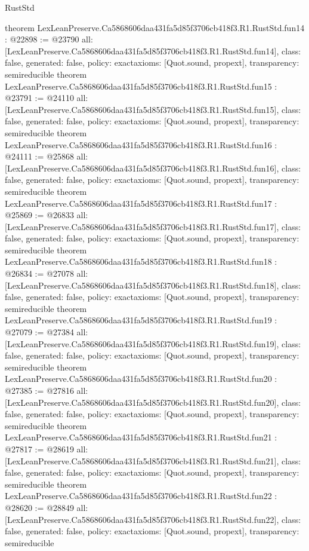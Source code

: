 \begin{lexlean}{RustStd}
\begin{coremodule}
{}
theorem LexLeanPreserve.Ca5868606daa431fa5d85f3706cb418f3.R1.RustStd.fun14 : @22898 := @23790 {
  all: [LexLeanPreserve.Ca5868606daa431fa5d85f3706cb418f3.R1.RustStd.fun14],
  class: false,
  generated: false,
  policy: exact{axioms: [Quot.sound, propext]},
  transparency: semireducible
}
theorem LexLeanPreserve.Ca5868606daa431fa5d85f3706cb418f3.R1.RustStd.fun15 : @23791 := @24110 {
  all: [LexLeanPreserve.Ca5868606daa431fa5d85f3706cb418f3.R1.RustStd.fun15],
  class: false,
  generated: false,
  policy: exact{axioms: [Quot.sound, propext]},
  transparency: semireducible
}
theorem LexLeanPreserve.Ca5868606daa431fa5d85f3706cb418f3.R1.RustStd.fun16 : @24111 := @25868 {
  all: [LexLeanPreserve.Ca5868606daa431fa5d85f3706cb418f3.R1.RustStd.fun16],
  class: false,
  generated: false,
  policy: exact{axioms: [Quot.sound, propext]},
  transparency: semireducible
}
theorem LexLeanPreserve.Ca5868606daa431fa5d85f3706cb418f3.R1.RustStd.fun17 : @25869 := @26833 {
  all: [LexLeanPreserve.Ca5868606daa431fa5d85f3706cb418f3.R1.RustStd.fun17],
  class: false,
  generated: false,
  policy: exact{axioms: [Quot.sound, propext]},
  transparency: semireducible
}
theorem LexLeanPreserve.Ca5868606daa431fa5d85f3706cb418f3.R1.RustStd.fun18 : @26834 := @27078 {
  all: [LexLeanPreserve.Ca5868606daa431fa5d85f3706cb418f3.R1.RustStd.fun18],
  class: false,
  generated: false,
  policy: exact{axioms: [Quot.sound, propext]},
  transparency: semireducible
}
theorem LexLeanPreserve.Ca5868606daa431fa5d85f3706cb418f3.R1.RustStd.fun19 : @27079 := @27384 {
  all: [LexLeanPreserve.Ca5868606daa431fa5d85f3706cb418f3.R1.RustStd.fun19],
  class: false,
  generated: false,
  policy: exact{axioms: [Quot.sound, propext]},
  transparency: semireducible
}
theorem LexLeanPreserve.Ca5868606daa431fa5d85f3706cb418f3.R1.RustStd.fun20 : @27385 := @27816 {
  all: [LexLeanPreserve.Ca5868606daa431fa5d85f3706cb418f3.R1.RustStd.fun20],
  class: false,
  generated: false,
  policy: exact{axioms: [Quot.sound, propext]},
  transparency: semireducible
}
theorem LexLeanPreserve.Ca5868606daa431fa5d85f3706cb418f3.R1.RustStd.fun21 : @27817 := @28619 {
  all: [LexLeanPreserve.Ca5868606daa431fa5d85f3706cb418f3.R1.RustStd.fun21],
  class: false,
  generated: false,
  policy: exact{axioms: [Quot.sound, propext]},
  transparency: semireducible
}
theorem LexLeanPreserve.Ca5868606daa431fa5d85f3706cb418f3.R1.RustStd.fun22 : @28620 := @28849 {
  all: [LexLeanPreserve.Ca5868606daa431fa5d85f3706cb418f3.R1.RustStd.fun22],
  class: false,
  generated: false,
  policy: exact{axioms: [Quot.sound, propext]},
  transparency: semireducible
}
\end{coremodule}
\end{lexlean}
